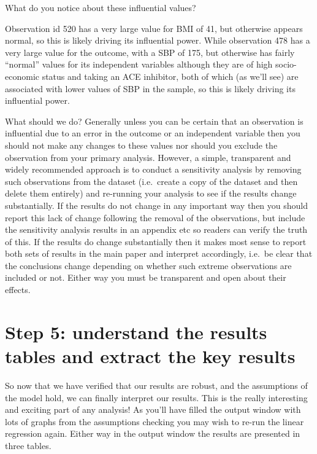 \documentclass[
]{book}
\begin{document}
What do you notice about these influential values?

Observation id 520 has a very large value for BMI of 41, but otherwise appears normal, so this is likely driving its influential power. While observation 478 has a very large value for the outcome, with a SBP of 175, but otherwise has fairly ``normal'' values for its independent variables although they are of high socio-economic status and taking an ACE inhibitor, both of which (as we'll see) are associated with lower values of SBP in the sample, so this is likely driving its influential power.

What should we do? Generally unless you can be certain that an observation is influential due to an error in the outcome or an independent variable then you should not make any changes to these values nor should you exclude the observation from your primary analysis. However, a simple, transparent and widely recommended approach is to conduct a sensitivity analysis by removing such observations from the dataset (i.e.~create a copy of the dataset and then delete them entirely) and re-running your analysis to see if the results change substantially. If the results do not change in any important way then you should report this lack of change following the removal of the observations, but include the sensitivity analysis results in an appendix etc so readers can verify the truth of this. If the results do change substantially then it makes most sense to report both sets of results in the main paper and interpret accordingly, i.e.~be clear that the conclusions change depending on whether such extreme observations are included or not. Either way you must be transparent and open about their effects.

\hypertarget{step-5-understand-the-results-tables-and-extract-the-key-results}{%
\section{Step 5: understand the results tables and extract the key results}\label{step-5-understand-the-results-tables-and-extract-the-key-results}}

So now that we have verified that our results are robust, and the assumptions of the model hold, we can finally interpret our results. This is the really interesting and exciting part of any analysis! As you'll have filled the output window with lots of graphs from the assumptions checking you may wish to re-run the linear regression again. Either way in the output window the results are presented in three tables.
\end{document}
